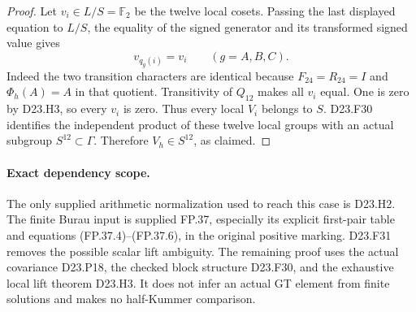 \begin{proof}
Let $v_i\in L/S=\mathbb F_2$ be the twelve local cosets.
Passing the last displayed equation to $L/S$, the equality
of the signed generator and its transformed signed value
gives
\[
                          v_{q_g(i)}=v_i
                \qquad(g=A,B,C).
\]
Indeed the two transition characters are identical because
$F_{24}=R_{24}=I$ and $\Phi_h(A)=A$ in that quotient.
Transitivity of $Q_{12}$ makes all $v_i$ equal. One is zero
by D23.H3, so every $v_i$ is zero. Thus every local $V_i$
belongs to $S$. D23.F30 identifies the independent product
of these twelve local groups with an actual subgroup
$S^{12}\subset\Gamma$. Therefore $V_h\in S^{12}$, as
claimed.
\end{proof}

\paragraph{Exact dependency scope.}
The only supplied arithmetic normalization used to reach this
case is D23.H2. The finite Burau input is supplied FP.37,
especially its explicit first-pair table and equations
(FP.37.4)--(FP.37.6), in the original positive marking.
D23.F31 removes the possible scalar lift ambiguity. The
remaining proof uses the actual covariance D23.P18, the
checked block structure D23.F30, and the exhaustive local
lift theorem D23.H3. It does not infer an actual GT element
from finite solutions and makes no half-Kummer comparison.
